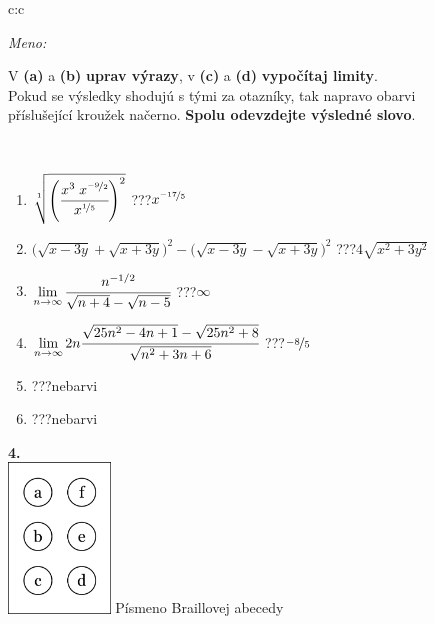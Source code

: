 \documentclass[10pt]{report}
\begin{document}
\begin{tabular}{c:c}
\begin{minipage}[c][104.5mm][t]{0.5\linewidth}
\begin{center}
\textit{Meno:}\phantom{xxxxxxxxxxxxxxxxxxxxxxxxxxxxxxxxxxxxxxxxxxxxxxxxxxxxxxxxxxxxxxxxx}\\[5mm]
\begin{minipage}{0.95\linewidth}
\begin{center}
V \textbf{(a)} a \textbf{(b)} \textbf{uprav výrazy}, v \textbf{(c)} a \textbf{(d)} \textbf{vypočítaj limity}.\\Pokud se výsledky shodujú s tými za otazníky, tak napravo obarvi\\příslušející kroužek načerno. \textbf{Spolu odevzdejte výsledné slovo}.
\end{center}
\end{minipage}
\\[1mm]
\begin{minipage}{0.79\linewidth}
\begin{center}
\begin{varwidth}{\linewidth}
\begin{enumerate}
\small
\item $\sqrt[1]{\left(\cfrac{x^{3}\;x^{\nicefrac{-9}{2}}}{x^{\nicefrac{1}{5}}}\right)^{2}}$\quad \dotfill\; ???\;\dotfill \quad $x^{\nicefrac{-17}{5}}$
\item {\footnotesize{\scriptsize$\big(\sqrt{x-3y}+\sqrt{x+3y}\big)^2-\big(\sqrt{x-3y}-\sqrt{x+3y}\big)^2$}\quad \dotfill\; ???\;\dotfill \quad $4\sqrt{x^2+3y^2}$}
\item $\lim\limits_{n\to\infty}\cfrac{n^{-1/2}}{\sqrt{n+4}-\sqrt{n-5}}$\quad \dotfill\; ???\;\dotfill \quad $\infty$
\item $\lim\limits_{n\to\infty}2n\cfrac{\sqrt{25n^2-4n+1}-\sqrt{25n^2+8}}{\sqrt{n^2+3n+6}}$\quad \dotfill\; ???\;\dotfill \quad $\nicefrac{-8}{5}$
\item \quad \dotfill\; ???\;\dotfill \quad nebarvi
\item \quad \dotfill\; ???\;\dotfill \quad nebarvi
\end{enumerate}
\end{varwidth}
\end{center}
\end{minipage}
\begin{minipage}{0.20\linewidth}
\begin{center}
{\Huge\bfseries 4.} \\[2mm]
\includegraphics[height=40mm]{../images/braille.png}
{\small Písmeno Braillovej abecedy}
\end{center}
\end{minipage}
\end{center}
\end{minipage}
%
\end{tabular}
\end{document}
